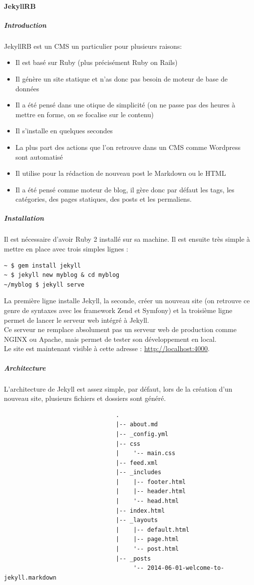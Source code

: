 \documentclass[11pt,a4paper]{report}
\begin{document}
			\paragraph{JekyllRB}
				\subparagraph{Introduction}JekyllRB est un CMS un particulier pour plusieurs raisons:
					\begin{itemize}
						\item Il est basé sur Ruby (plus précisément Ruby on Rails)
						\item Il génère un site statique et n'as donc pas besoin de moteur de base de données
						\item Il a été pensé dans une otique de simplicité (on ne passe pas des heures à mettre en forme, on se focalise sur le contenu)
						\item Il s'installe en quelques secondes
						\item La plus part des actions que l'on retrouve dans un CMS comme Wordpress sont automatisé
						\item Il utilise pour la rédaction de nouveau post le Markdown ou le HTML
						\item Il a été pensé comme moteur de blog, il gère donc par défaut les tags, les catégories, des pages statiques, des posts et les permaliens.
					\end{itemize}
				\subparagraph{Installation}Il est nécessaire d'avoir Ruby 2 installé sur sa machine. Il est ensuite très simple à mettre en place avec trois simples lignes :
					\lstset{language=bash, tabsize=4}
					\begin{lstlisting}
~ $ gem install jekyll
~ $ jekyll new myblog & cd myblog
~/myblog $ jekyll serve
					\end{lstlisting}
					La première ligne installe Jekyll, la seconde, créer un nouveau site (on retrouve ce genre de syntaxes avec les framework Zend et Symfony) et la troisième ligne permet de lancer le serveur web intégré à Jekyll.\\
					Ce serveur ne remplace absolument pas un serveur web de production comme NGINX ou Apache, mais permet de tester son développement en local.\\
					Le site est maintenant visible à cette adresse : \url{http://localhost:4000}.
				\subparagraph{Architecture}L'architecture de Jekyll est assez simple, par défaut, lors de la création d'un nouveau site, plusieurs fichiers et dossiers sont généré.
					\begin{lstlisting}
								.
								|-- about.md
								|-- _config.yml
								|-- css
								|    '-- main.css
								|-- feed.xml
								|-- _includes
								|    |-- footer.html
								|    |-- header.html
								|    '-- head.html
								|-- index.html
								|-- _layouts
								|    |-- default.html
								|    |-- page.html
								|    '-- post.html
								|-- _posts
					     			 '-- 2014-06-01-welcome-to-jekyll.markdown
					\end{lstlisting}
\end{document}
